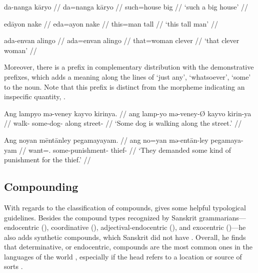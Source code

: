 \pex
\a\begingl
	\gla da-nanga kāryo //
	\glb da=nanga kāryo //
	\glc such=house big //
	\glft `such a big house' //
\endgl

\a\begingl
	\gla edāyon nake //
	\glb eda=ayon nake //
	\glc this=man tall //
	\glft `this tall man' //
\endgl

\a\begingl
	\gla ada-envan alingo //
	\glb ada=envan alingo //
	\glc that=woman clever //
	\glft `that clever woman' //
\endgl

\xe

Moreover, there is a prefix  in complementary distribution with
the demonstrative prefixes, which adds a meaning along the lines of `just any',
`whatsoever', `some' to the noun. Note that this prefix is distinct from the
morpheme indicating an inspecific quantity, .

\pex
\a\begingl
	\gla Ang lampyo mə-veney kayvo kirinya. //
	\glb ang lamp-yo mə-veney-Ø kayvo kirin-ya //
	\glc \AgtT{} walk-\TsgN{} some-dog-\Top{} along street-\Loc{} //
	\glft `Some dog is walking along the street.' //
\endgl

\a\begingl
	\gla Ang noyan mēntānley pegamayayam. //
	\glb ang no=yan mə-entān-ley pegamaya-yam //
	\glc \AgtT{} want=\TsgM{}.\Top{} some-punishment-\PargI{} 
		thief-\Dat{} //
	\glft `They demanded some kind of punishment for the thief.' //
\endgl

\xe


\subsection{Compounding}

With regards to the classification of compounds, \citet{bauer2001} gives some 
helpful typological guidelines. Besides the compound types recognized by 
Sanskrit grammarians---endocentric (), coordinative 
(), adjectival-endo\-cent\-ric (), and 
exocentric ()---he also adds synthetic compounds, which Sanskrit 
did not have \citep[697]{bauer2001}. Overall, he finds that determinative, or 
endocentric, compounds are the most common ones in the languages of the world 
\citep[697]{bauer2001}, especially if the head refers to a location or source 
of sorts \citep[702]{bauer2001}.


